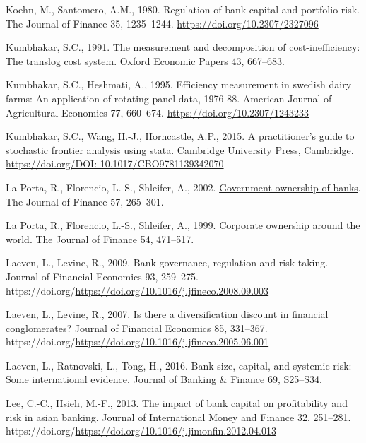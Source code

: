 \documentclass[
  12pt,
  a4paper,
]{scrreprt}
\newlength{\cslhangindent}
\newenvironment{CSLReferences}[2] %
 {\begin{list}{}{%
  \setlength{\itemindent}{0pt}
  \setlength{\leftmargin}{0pt}
  \setlength{\parsep}{0pt}
  \ifodd #1
   \setlength{\leftmargin}{\cslhangindent}
   \setlength{\itemindent}{-1\cslhangindent}
  \fi
  \setlength{\itemsep}{#2\baselineskip}}}
 {\end{list}}
\begin{document}
\begin{CSLReferences}{1}{0}
Koehn, M., Santomero, A.M., 1980. Regulation of bank capital and
portfolio risk. The Journal of Finance 35, 1235--1244.
\url{https://doi.org/10.2307/2327096}

Kumbhakar, S.C., 1991. \href{http://www.jstor.org/stable/2663415}{The
measurement and decomposition of cost-inefficiency: The translog cost
system}. Oxford Economic Papers 43, 667--683.

Kumbhakar, S.C., Heshmati, A., 1995. Efficiency measurement in swedish
dairy farms: An application of rotating panel data, 1976-88. American
Journal of Agricultural Economics 77, 660--674.
\url{https://doi.org/10.2307/1243233}

Kumbhakar, S.C., Wang, H.-J., Horncastle, A.P., 2015. A practitioner's
guide to stochastic frontier analysis using stata. Cambridge University
Press, Cambridge.
\href{https://doi.org/DOI:\%2010.1017/CBO9781139342070}{https://doi.org/DOI:
10.1017/CBO9781139342070}

La Porta, R., Florencio, L.-S., Shleifer, A., 2002.
\href{http://www.jstor.org.queens.ezp1.qub.ac.uk/stable/2697840}{Government
ownership of banks}. The Journal of Finance 57, 265--301.

La Porta, R., Florencio, L.-S., Shleifer, A., 1999.
\href{http://www.jstor.org.queens.ezp1.qub.ac.uk/stable/2697717}{Corporate
ownership around the world}. The Journal of Finance 54, 471--517.

Laeven, L., Levine, R., 2009. Bank governance, regulation and risk
taking. Journal of Financial Economics 93, 259--275.
https://doi.org/\url{https://doi.org/10.1016/j.jfineco.2008.09.003}

Laeven, L., Levine, R., 2007. Is there a diversification discount in
financial conglomerates? Journal of Financial Economics 85, 331--367.
https://doi.org/\url{https://doi.org/10.1016/j.jfineco.2005.06.001}

Laeven, L., Ratnovski, L., Tong, H., 2016. Bank size, capital, and
systemic risk: Some international evidence. Journal of Banking \&
Finance 69, S25--S34.

Lee, C.-C., Hsieh, M.-F., 2013. The impact of bank capital on
profitability and risk in asian banking. Journal of International Money
and Finance 32, 251--281.
https://doi.org/\url{https://doi.org/10.1016/j.jimonfin.2012.04.013}


\end{CSLReferences}
\end{document}
